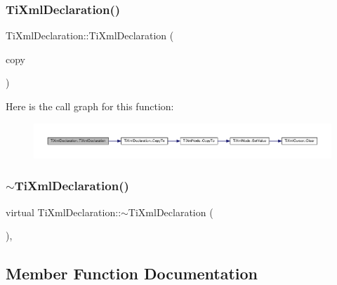 \subsubsection{\texorpdfstring{Ti\+Xml\+Declaration()}{TiXmlDeclaration()}\hspace{0.1cm}{\footnotesize\ttfamily [3/3]}}
{\footnotesize\ttfamily Ti\+Xml\+Declaration\+::\+Ti\+Xml\+Declaration (\begin{DoxyParamCaption}\item[{const \hyperlink{class_ti_xml_declaration}{Ti\+Xml\+Declaration} \&}]{copy }\end{DoxyParamCaption})}

Here is the call graph for this function\+:\nopagebreak
\begin{figure}[H]
\begin{center}
\leavevmode
\includegraphics[width=350pt]{class_ti_xml_declaration_a58ac9042c342f7845c8491da0bb091e8_cgraph}
\end{center}
\end{figure}
\mbox{\label{class_ti_xml_declaration_ad5f37a673f4c507fd7e550470f9cec25}} 
\subsubsection{\texorpdfstring{$\sim$\+Ti\+Xml\+Declaration()}{~TiXmlDeclaration()}}
{\footnotesize\ttfamily virtual Ti\+Xml\+Declaration\+::$\sim$\+Ti\+Xml\+Declaration (\begin{DoxyParamCaption}{ }\end{DoxyParamCaption})\hspace{0.3cm}{\ttfamily [inline]}, {\ttfamily [virtual]}}



\subsection{Member Function Documentation}
\mbox{\label{class_ti_xml_declaration_aa1b6bade6c989407ce9881bdfc73c1e6}} 
